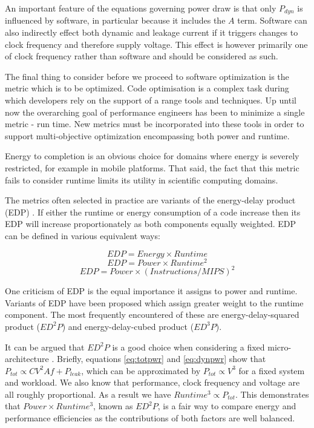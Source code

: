 An important feature of the equations governing power draw is that only $P_{dyn}$ is influenced by software, in particular because it includes the $A$ term. Software can also indirectly effect both dynamic and leakage current if it triggers changes to clock frequency and therefore supply voltage. This effect is however primarily one of clock frequency rather than software and should be considered as such.\golden

The final thing to consider before we proceed to software optimization is the metric which is to be optimized. Code optimisation is a complex task during which developers rely on the support of a range tools and techniques. Up until now the overarching goal of performance engineers has been to minimize a single metric - run time. New metrics must be incorporated into these tools in order to support multi-objective optimization encompassing both power and runtime. \golden

Energy to completion is an obvious choice for domains where energy is severely restricted, for example in mobile platforms. That said, the fact that this metric fails to consider runtime limits its utility in scientific computing domains.\golden

The metrics often selected in practice are variants of the energy-delay product (EDP) \cite{gonzales:1995aa}. If either the runtime or energy consumption of a code increase then its EDP will increase proportionately as both components equally weighted. EDP can be defined in various equivalent ways:\golden

\begin{equation}
EDP = Energy \times Runtime
\end{equation}
\begin{equation}
\label{eq:edp}
EDP = Power \times Runtime^{2}
\end{equation}
\begin{equation}
EDP = Power \times (Instructions / MIPS)^{2}
\end{equation}

One criticism of EDP is the equal importance it assigns to power and runtime. Variants of EDP have been proposed which assign greater weight to the runtime component. The most frequently encountered of these are  energy-delay-squared product ($ED^{2}P$) and energy-delay-cubed product ($ED^{3}P$). \golden


 It can be argued that $ED^{2}P$ is a good choice when considering a fixed micro-architecture \cite{brooks:2000aa}. Briefly, equations \ref{eq:totpwr} and \ref{eq:dynpwr} show that $P_{tot} \propto CV^{2}Af + P_{leak} $, which can be approximated by $P_{tot} \propto V^{3}$ for a fixed system and workload. We also know that performance, clock frequency and voltage are all roughly proportional. As a result we have $Runtime^{3} \propto P_{tot}$. This demonstrates that $Power \times Runtime^{3}$, known as $ED^{2}P$, is a fair way to compare energy and performance efficiencies as the contributions of both factors are well balanced. \golden